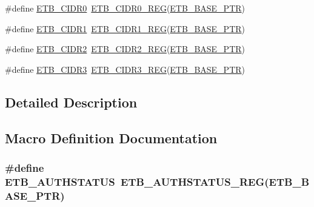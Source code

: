 \begin{DoxyCompactItemize}
\item 
\#define \hyperlink{group___e_t_b___register___accessor___macros_gaab78adf7c1cb1b9c87b0195888994b25}{E\+T\+B\+\_\+\+C\+I\+D\+R0}~\hyperlink{group___e_t_b___register___accessor___macros_gaef3bef6ae50cff5320041120f3afe155}{E\+T\+B\+\_\+\+C\+I\+D\+R0\+\_\+\+R\+EG}(\hyperlink{group___e_t_b___peripheral_gaaefe9b614cb5542a69cb7461307f1267}{E\+T\+B\+\_\+\+B\+A\+S\+E\+\_\+\+P\+TR})
\item 
\#define \hyperlink{group___e_t_b___register___accessor___macros_gaa2ed5cbc4614acbceaebe3743d8d1342}{E\+T\+B\+\_\+\+C\+I\+D\+R1}~\hyperlink{group___e_t_b___register___accessor___macros_ga78418b5ed936fc13437ad160c08e1fb4}{E\+T\+B\+\_\+\+C\+I\+D\+R1\+\_\+\+R\+EG}(\hyperlink{group___e_t_b___peripheral_gaaefe9b614cb5542a69cb7461307f1267}{E\+T\+B\+\_\+\+B\+A\+S\+E\+\_\+\+P\+TR})
\item 
\#define \hyperlink{group___e_t_b___register___accessor___macros_ga0a1991abf64d588fb262f8e3f349a650}{E\+T\+B\+\_\+\+C\+I\+D\+R2}~\hyperlink{group___e_t_b___register___accessor___macros_ga5b6b85634c6638877fb7e64d4d36dc64}{E\+T\+B\+\_\+\+C\+I\+D\+R2\+\_\+\+R\+EG}(\hyperlink{group___e_t_b___peripheral_gaaefe9b614cb5542a69cb7461307f1267}{E\+T\+B\+\_\+\+B\+A\+S\+E\+\_\+\+P\+TR})
\item 
\#define \hyperlink{group___e_t_b___register___accessor___macros_gadaa5e743c6083fc4249bd1777313895f}{E\+T\+B\+\_\+\+C\+I\+D\+R3}~\hyperlink{group___e_t_b___register___accessor___macros_gafcbde86bf4b8213b6d778e9d84064757}{E\+T\+B\+\_\+\+C\+I\+D\+R3\+\_\+\+R\+EG}(\hyperlink{group___e_t_b___peripheral_gaaefe9b614cb5542a69cb7461307f1267}{E\+T\+B\+\_\+\+B\+A\+S\+E\+\_\+\+P\+TR})
\end{DoxyCompactItemize}


\subsection{Detailed Description}


\subsection{Macro Definition Documentation}
\subsubsection[{\texorpdfstring{E\+T\+B\+\_\+\+A\+U\+T\+H\+S\+T\+A\+T\+US}{ETB_AUTHSTATUS}}]{\setlength{\rightskip}{0pt plus 5cm}\#define E\+T\+B\+\_\+\+A\+U\+T\+H\+S\+T\+A\+T\+US~{\bf E\+T\+B\+\_\+\+A\+U\+T\+H\+S\+T\+A\+T\+U\+S\+\_\+\+R\+EG}({\bf E\+T\+B\+\_\+\+B\+A\+S\+E\+\_\+\+P\+TR})}\hypertarget{group___e_t_b___register___accessor___macros_ga1ef35a657a08d2729eb5a8c86307ae7a}{}\label{group___e_t_b___register___accessor___macros_ga1ef35a657a08d2729eb5a8c86307ae7a}


